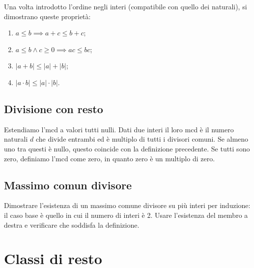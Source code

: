 \documentclass[a4paper]{article}
\begin{document}
Una volta introdotto l'ordine negli interi (compatibile con quello dei naturali),
si dimostrano queste proprietà:
\begin{enumerate}
    \item \(a \leq b \implies a+c \leq b+c\);
    \item \(a \leq b \land c \geq 0 \implies ac \leq bc\);
    \item \(|a+b| \leq |a| + |b|\);
    \item \(|a\cdot b| \leq |a|\cdot|b|\).
\end{enumerate}

\subsection{Divisione con resto}

Estendiamo l'mcd a valori tutti nulli.
Dati due interi il loro mcd è il numero naturali
\(d\) che divide entrambi ed è multiplo di tutti i divisori comuni.
Se almeno uno tra questi è nullo, questo coincide con la definizione precedente.
Se tutti sono zero, definiamo l'mcd come zero, in quanto zero è un multiplo di zero.

\subsection{Massimo comun divisore}

Dimostrare l'esistenza di un massimo comune divisore su più interi
per induzione: il caso base è quello in cui il numero di interi è 2.
Usare l'esistenza del membro a destra e verificare che soddisfa la definizione.


\section{Classi di resto}
\end{document}
